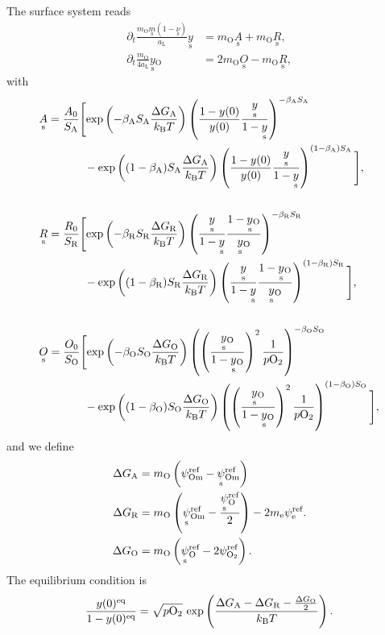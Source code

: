 \documentclass{article}
\numberwithin{equation}{section}
\newcommand{\us}[1]{\underset{\textrm{s}}{#1}{}}
\def\kB{k_\mathrm{B}}
\def\Ox{\mathrm{O}}
\newcommand{\OO}{{\ce{O2}}}
\def\aL{a_\mathrm{L}}
\def\ys{\us y}
\def\y0{y(0)}
\def\yOs{\us y_\textrm{O}}
\def\pO2{p\OO}
\def\A0{A_0}
\def\R0{R_0}
\def\K0{O_0}
\def\DGA{\Delta G_\textrm{A}  }
\def\DGR{\Delta G_\textrm{R}  }
\def\DGO{\Delta G_\textrm{O}  }
\def\betaA{\beta_\textrm{A}}
\def\betaR{\beta_\textrm{R}}
\def\betaO{\beta_\textrm{O}}
\def\SA{S_\textrm{A}}
\def\SR{S_\textrm{R}}
\def\SO{S_\textrm{O}}
\def\eq{\textrm{eq}}
\def\REF{\textrm{ref}}
\begin{document}
The surface system reads
\begin{subequations}
\begin{align}
\partial_t \frac{m_\Ox \us m (1- \us \nu)}{\aL} \ys
&=
m_\Ox \us A
+
m_\Ox \us R,
\\
\partial_t \frac{m_\Ox}{4 \aL} \yOs
&=
2 m_\Ox \us O
-
m_\Ox \us R,
\end{align}
\end{subequations}
with
\begin{subequations}
\begin{align}
&\us A
=
\frac{\A0}{\SA}
\Bigg[
	\textrm{exp}
	\left(
		{-\betaA \SA \frac{\DGA}{\kB T}}
	\right)
	\left(
		\frac{1 - \y0}{\y0}
		\frac{\ys}{1-\ys}
	\right)^{-\betaA \SA}
\\ \nonumber
	&\quad \quad \quad \quad	
	-
	\textrm{exp}
	\left(
		{(1-\betaA) \SA \frac{\DGA}{\kB T}}
	\right)
	\left(
		\frac{1 - \y0}{\y0}
		\frac{\ys}{1-\ys}
	\right)^{(1-\betaA) \SA}
\Bigg],
\\ \nonumber
\\
&\us R
=
\frac{\R0}{\SR}
\Bigg[
	\textrm{exp}
	\left(
		{-\betaR \SR \frac{\DGR}{\kB T}}
	\right)
	\left(
		\frac{\ys}{1- \ys}
		\frac{1-\yOs}{\yOs}
	\right)^{-\betaR \SR}
\\ \nonumber
	& \quad \quad \quad \quad	
	-
	\textrm{exp}
	\left(
		{(1 - \betaR) \SR \frac{\DGR}{\kB T}}
	\right)
	\left(
		\frac{\ys}{1- \ys}
		\frac{1-\yOs}{\yOs}
	\right)^{(1-\betaR) \SR}
\Bigg],
\\ \nonumber
\\
&\us O
=
\frac{\K0}{\SO}
\Bigg[
	\textrm{exp}
	\left(
		{-\betaO \SO \frac{\DGO}{\kB T}}
	\right)
	\left(
		\left(
			\frac{\yOs}{1-\yOs}
		\right)^2
		\frac{1}{\pO2}
	\right)^{-\betaO \SO}
\\ \nonumber
	&\quad \quad \quad \quad	
	-
	\textrm{exp}
	\left(
		{(1-\betaO) \SO \frac{\DGO}{\kB T}}
	\right)
	\left(
		\left(
			\frac{\yOs}{1-\yOs}
		\right)^2
		\frac{1}{\pO2}
	\right)^{(1 - \betaO) \SO}
\Bigg],
\end{align}
\end{subequations}
and we define
\begin{subequations}
\begin{align}
\DGA
&=
m_\Ox
\left(
	\psi_{\textrm{Om}}^\REF
	-
	\us \psi_{\textrm{Om}}^\REF
\right)
\\
\DGR
&= 
m_\Ox
\left(
	\us \psi_{\textrm{Om}}^\REF
	-
	\frac{\us \psi_{\Ox}^\REF}{2}
\right)
-
2 m_\textrm{e} \psi_{\textrm{e}}^\REF.
\\
\DGO
&= 
m_\Ox
\left(
	\us \psi_{\Ox}^\REF
	-
	2 \psi_{\OO}^\REF
\right).
\end{align}
\end{subequations}
The equilibrium condition is
\begin{subequations}
\begin{align}
\frac{\y0^\eq}{1-\y0^\eq} = \sqrt{\pO2} \ \textrm{exp}
\left(
	\frac{\DGA - \DGR - \frac{\DGO}{2}}{\kB T}
\right).
\end{align}
\end{subequations}
\end{document}
